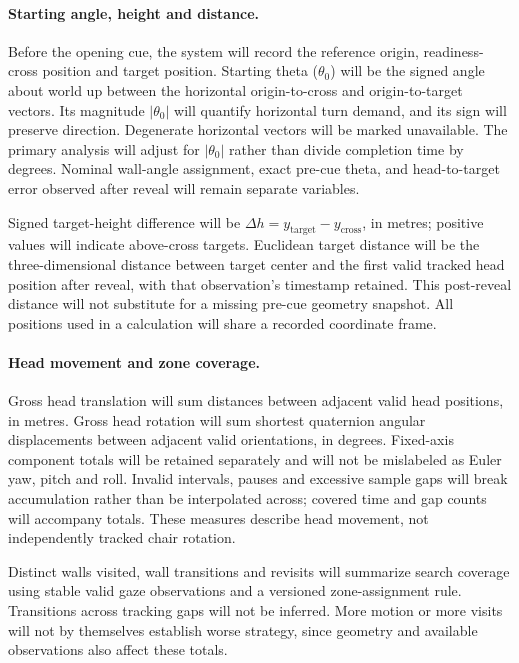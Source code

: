 \documentclass[11pt,letterpaper]{article}
\begin{document}
\paragraph{Starting angle, height and distance.} Before the opening cue, the system will record the reference origin, readiness-cross position and target position. Starting theta ($\theta_0$) will be the signed angle about world up between the horizontal origin-to-cross and origin-to-target vectors. Its magnitude $|\theta_0|$ will quantify horizontal turn demand, and its sign will preserve direction. Degenerate horizontal vectors will be marked unavailable. The primary analysis will adjust for $|\theta_0|$ rather than divide completion time by degrees. Nominal wall-angle assignment, exact pre-cue theta, and head-to-target error observed after reveal will remain separate variables.

Signed target-height difference will be $\Delta h=y_{\mathrm{target}}-y_{\mathrm{cross}}$, in metres; positive values will indicate above-cross targets. Euclidean target distance will be the three-dimensional distance between target center and the first valid tracked head position after reveal, with that observation's timestamp retained. This post-reveal distance will not substitute for a missing pre-cue geometry snapshot. All positions used in a calculation will share a recorded coordinate frame.

\paragraph{Head movement and zone coverage.} Gross head translation will sum distances between adjacent valid head positions, in metres. Gross head rotation will sum shortest quaternion angular displacements between adjacent valid orientations, in degrees. Fixed-axis component totals will be retained separately and will not be mislabeled as Euler yaw, pitch and roll. Invalid intervals, pauses and excessive sample gaps will break accumulation rather than be interpolated across; covered time and gap counts will accompany totals. These measures describe head movement, not independently tracked chair rotation.

Distinct walls visited, wall transitions and revisits will summarize search coverage using stable valid gaze observations and a versioned zone-assignment rule. Transitions across tracking gaps will not be inferred. More motion or more visits will not by themselves establish worse strategy, since geometry and available observations also affect these totals.
\end{document}

